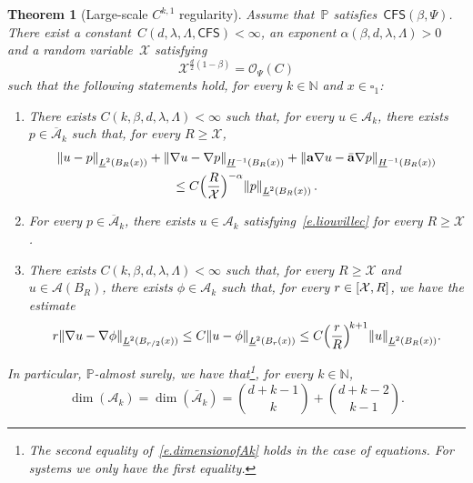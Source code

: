 \documentclass[11pt]{article} %
\let\oldsquare\square %
\renewcommand{\square}{\oldsquare}
\numberwithin{equation}{section}
\newtheorem{theorem}{Theorem}[section]
\theoremstyle{definition}
\let\originalleft\left
\let\originalright\right
\renewcommand{\left}{\mathopen{}\mathclose\bgroup\originalleft}
\renewcommand{\right}{\aftergroup\egroup\originalright}
\newcommand*{\N}{\ensuremath{\mathbb{N}}}
\newcommand*{\Rd}{\ensuremath{\mathbb{R}^d}}
\renewcommand{\a}{\mathbf{a}}
\newcommand{\ahom}{\bar{\a}}
\newcommand{\cu}{\square}
\renewcommand{\P}{\mathbb{P}}
\newcommand{\X}{\mathcal{X}}
\renewcommand{\O}{\mathcal{O}}
\newcommand{\CFS}{\mathsf{CFS}}
\newcommand{\A}{\mathcal{A}}
\newcommand{\Ahom}{\bar{\A}}
\begin{document}
\begin{theorem}[{Large-scale $C^{k,1}$ regularity}]
\label{t.Ck1}
Assume that~$\P$ satisfies~$\CFS(\beta,\Psi)$.
There exist a constant~$C(d,\lambda,\Lambda,\CFS)<\infty$, an exponent $\alpha(\beta,d,\lambda,\Lambda)>0$ and a random variable~$\X$ satisfying
\begin{equation}
\label{e.X}
\X^{\frac d2(1-\beta)  } 
= 
\O_{\Psi}(C) 
\end{equation}
such that the following statements hold, for every $k\in\N$ and $x \in \cu_1$:
\begin{enumerate}
\item[{$\mathrm{(i)}_k$}] There exists $C(k,\beta,d,\lambda,\Lambda)<\infty$ such that, for every $u \in \A_k$, there exists $p\in \overline{\A}_k$ such that, for every $R\geq \X$,
\begin{multline} \label{e.liouvillec}
\left\| u - p \right\|_{\underline{L}^2(B_R(x))} 
+
\left\|  \nabla u - \nabla p \right\|_{\underline{H}^{-1}(B_R(x))} 
+
\left\|  \a \nabla u - \ahom \nabla p \right\|_{\underline{H}^{-1}(B_R(x))} 
\\ 
\leq 
C \Bigl( \frac{R}{\X} \Bigr)^{-\alpha}
\left\| p \right\|_{\underline{L}^2(B_R(x))}
\,.
\end{multline}

\item[{$\mathrm{(ii)}_k$}]For every $p\in \overline{\A}_k$, there exists $u\in \A_k$ satisfying~\eqref{e.liouvillec} for every $R\geq \X$. 

\item[{$\mathrm{(iii)}_k$}]
There exists $C(k,\beta,d,\lambda,\Lambda)<\infty$ such that, for every $R\geq \X$ and $u\in \A(B_R)$, there exists $\phi \in \A_k$ such that, for every $r \in \left[ \X,  R \right]$, we have the estimate
\begin{equation}
\label{e.intrinsicreg}
r \left\| \nabla u - \nabla \phi \right\|_{\underline{L}^2(B_{r/2}(x))}
\leq 
C \left\| u - \phi \right\|_{\underline{L}^2(B_r(x))} 
\leq 
C \Bigl( \frac r R \Bigr)^{\!k+1} %
\left\| u \right\|_{\underline{L}^2(B_R(x))}.
\end{equation}
\end{enumerate}
In particular, $\P$-almost surely, we have that\footnote{The second equality of~\eqref{e.dimensionofAk} holds in the case of equations. For systems we only have the first equality.}, for every $k\in\N$,
\begin{equation} 
\label{e.dimensionofAk}
\dim(\A_k) = \dim(\Ahom_k) =  \binom{d+k-1}{k} + \binom{d+k-2}{k-1}.
\end{equation}
\end{theorem}
\end{document}
